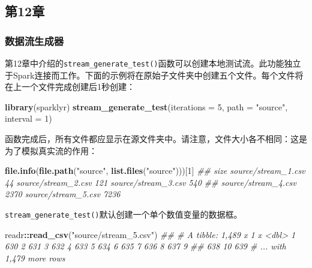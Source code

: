 \documentclass[
]{article}
\newenvironment{Shaded}{\begin{snugshade}}{\end{snugshade}}
\newcommand{\CommentTok}[1]{\textcolor[rgb]{0.56,0.35,0.01}{\textit{#1}}}
\newcommand{\DataTypeTok}[1]{\textcolor[rgb]{0.13,0.29,0.53}{#1}}
\newcommand{\DecValTok}[1]{\textcolor[rgb]{0.00,0.00,0.81}{#1}}
\newcommand{\KeywordTok}[1]{\textcolor[rgb]{0.13,0.29,0.53}{\textbf{#1}}}
\newcommand{\NormalTok}[1]{#1}
\newcommand{\OperatorTok}[1]{\textcolor[rgb]{0.81,0.36,0.00}{\textbf{#1}}}
\newcommand{\StringTok}[1]{\textcolor[rgb]{0.31,0.60,0.02}{#1}}
\begin{document}
\hypertarget{ux7b2c12ux7ae0}{%
\subsection{第12章}\label{ux7b2c12ux7ae0}}

\hypertarget{ux6570ux636eux6d41ux751fux6210ux5668}{%
\subsubsection{数据流生成器}\label{ux6570ux636eux6d41ux751fux6210ux5668}}

第12章中介绍的\texttt{stream\_generate\_test()}函数可以创建本地测试流。此功能独立于Spark连接而工作。下面的示例将在原始子文件夹中创建五个文件。每个文件将在上一个文件完成创建后1秒创建：

\begin{Shaded}
\begin{Highlighting}[]
\KeywordTok{library}\NormalTok{(sparklyr)}
\KeywordTok{stream_generate_test}\NormalTok{(}\DataTypeTok{iterations =} \DecValTok{5}\NormalTok{, }\DataTypeTok{path =} \StringTok{"source"}\NormalTok{, }\DataTypeTok{interval =} \DecValTok{1}\NormalTok{)}
\end{Highlighting}
\end{Shaded}

函数完成后，所有文件都应显示在源文件夹中。请注意，文件大小各不相同：这是为了模拟真实流的作用：

\begin{Shaded}
\begin{Highlighting}[]
\KeywordTok{file.info}\NormalTok{(}\KeywordTok{file.path}\NormalTok{(}\StringTok{"source"}\NormalTok{, }\KeywordTok{list.files}\NormalTok{(}\StringTok{"source"}\NormalTok{)))[}\DecValTok{1}\NormalTok{]}
\CommentTok{## size source/stream_1.csv 44 source/stream_2.csv 121 source/stream_3.csv 540}
\CommentTok{## source/stream_4.csv 2370 source/stream_5.csv 7236}
\end{Highlighting}
\end{Shaded}

\texttt{stream\_generate\_test()}默认创建一个单个数值变量的数据框。

\begin{Shaded}
\begin{Highlighting}[]
\NormalTok{readr}\OperatorTok{::}\KeywordTok{read_csv}\NormalTok{(}\StringTok{"source/stream_5.csv"}\NormalTok{)}
\CommentTok{## # A tibble: 1,489 x 1 x <dbl> 1 630 2 631 3 632 4 633 5 634 6 635 7 636 8 637 9}
\CommentTok{## 638 10 639 # ... with 1,479 more rows}
\end{Highlighting}
\end{Shaded}
\end{document}
